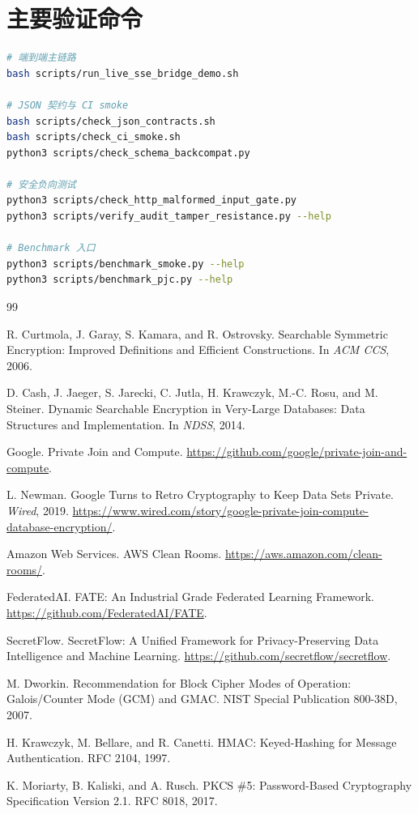 \documentclass[UTF8,a4paper,12pt,oneside]{ctexrep}
\begin{document}
\chapter{主要验证命令}

\begin{lstlisting}[language=bash]
# 端到端主链路
bash scripts/run_live_sse_bridge_demo.sh

# JSON 契约与 CI smoke
bash scripts/check_json_contracts.sh
bash scripts/check_ci_smoke.sh
python3 scripts/check_schema_backcompat.py

# 安全负向测试
python3 scripts/check_http_malformed_input_gate.py
python3 scripts/verify_audit_tamper_resistance.py --help

# Benchmark 入口
python3 scripts/benchmark_smoke.py --help
python3 scripts/benchmark_pjc.py --help
\end{lstlisting}

\begin{thebibliography}{99}

R. Curtmola, J. Garay, S. Kamara, and R. Ostrovsky.
Searchable Symmetric Encryption: Improved Definitions and Efficient Constructions.
In \textit{ACM CCS}, 2006.

D. Cash, J. Jaeger, S. Jarecki, C. Jutla, H. Krawczyk, M.-C. Rosu, and M. Steiner.
Dynamic Searchable Encryption in Very-Large Databases: Data Structures and Implementation.
In \textit{NDSS}, 2014.

Google.
Private Join and Compute.
\url{https://github.com/google/private-join-and-compute}.

L. Newman.
Google Turns to Retro Cryptography to Keep Data Sets Private.
\textit{Wired}, 2019.
\url{https://www.wired.com/story/google-private-join-compute-database-encryption/}.

Amazon Web Services.
AWS Clean Rooms.
\url{https://aws.amazon.com/clean-rooms/}.

FederatedAI.
FATE: An Industrial Grade Federated Learning Framework.
\url{https://github.com/FederatedAI/FATE}.

SecretFlow.
SecretFlow: A Unified Framework for Privacy-Preserving Data Intelligence and Machine Learning.
\url{https://github.com/secretflow/secretflow}.

M. Dworkin.
Recommendation for Block Cipher Modes of Operation: Galois/Counter Mode (GCM) and GMAC.
NIST Special Publication 800-38D, 2007.

H. Krawczyk, M. Bellare, and R. Canetti.
HMAC: Keyed-Hashing for Message Authentication.
RFC 2104, 1997.

K. Moriarty, B. Kaliski, and A. Rusch.
PKCS \#5: Password-Based Cryptography Specification Version 2.1.
RFC 8018, 2017.

\end{thebibliography}
\end{document}
